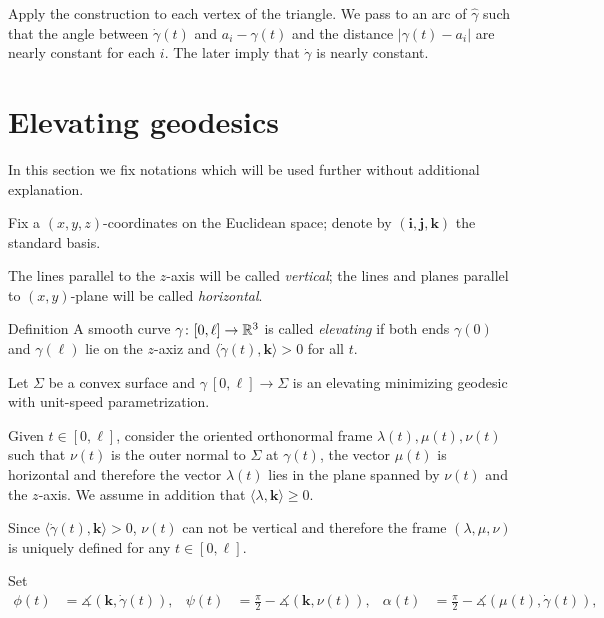 \documentclass[a4paper,10pt]{amsart}
\begin{document}
Apply the construction to each vertex of the triangle.
We pass to an arc of $\hat\gamma$
such that the angle between $\dot\gamma(t)$ and $a_i-\gamma(t)$ 
and the distance $|\gamma(t)-a_i|$
are nearly constant for each $i$.
The later imply that $\dot\gamma$ is nearly constant.
\qeds





\section{Elevating geodesics}\label{sec:elevating}

In this section we fix notations which will be used further 
without additional explanation.

Fix a $(x,y,z)$-coordinates on the Euclidean space;
denote by $(\bm{i},\bm{j},\bm{k})$
the standard basis.

The lines parallel to the $z$-axis will be called \emph{vertical};
the lines and planes parallel to $(x,y)$-plane will be called \emph{horizontal}.

\begin{thm}{Definition}
A smooth curve $\gamma\colon[0,\ell]\to\mathbb{R}^3$ 
is called \emph{elevating} if both ends $\gamma(0)$ and $\gamma(\ell)$ lie on the $z$-axiz and $\langle\dot\gamma(t),\bm{k}\rangle>0$ for all $t$.
\end{thm}

Let $\Sigma$ be a convex surface 
and $\gamma\:[0,\ell]\to \Sigma$ is an elevating minimizing geodesic 
with unit-speed parametrization.

Given $t\in [0,\ell]$, 
consider the oriented orthonormal frame $\lambda(t),\mu(t),\nu(t)$ 
such that $\nu(t)$ is the outer normal to $\Sigma$ at $\gamma(t)$,
the vector $\mu(t)$ is horizontal and therefore the vector $\lambda(t)$ lies in the plane spanned by $\nu(t)$ and the $z$-axis.
We assume in addition that $\langle\lambda,\bm{k}\rangle\ge 0$.

Since $\langle\dot\gamma(t),\bm{k}\rangle>0$, 
$\nu(t)$ can not be vertical 
and therefore the frame $(\lambda,\mu,\nu)$ is uniquely defined for any $t\in[0,\ell]$.

Set 
\begin{align*}
\phi(t)&=\measuredangle(\bm{k},\dot\gamma(t)),&
\psi(t)&=\tfrac\pi2-\measuredangle(\bm{k},\nu(t)),&
\alpha(t)&=\tfrac\pi2-\measuredangle(\mu(t),\dot\gamma(t)),
\end{align*}
\end{document}
